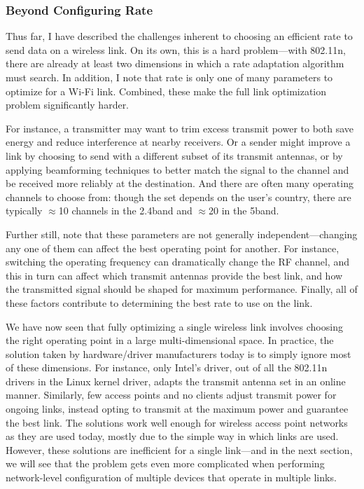 \subsubsection{Beyond Configuring Rate}
Thus far, I have described the challenges inherent to choosing an efficient rate to send data on a wireless link. On its own, this is a hard problem---with 802.11n, there are already at least two dimensions in which a rate adaptation algorithm must search. In addition, I note that rate is only one of many parameters to optimize for a Wi-Fi link. Combined, these make the full link optimization problem significantly harder.

For instance, a transmitter may want to trim excess transmit power to both save energy and reduce interference at nearby receivers. Or a sender might improve a link by choosing to send with a different subset of its transmit antennas, or by applying beamforming techniques to better match the signal to the channel and be received more reliably at the destination. And there are often many operating channels to choose from: though the set depends on the user's country, there are typically $\approx$10 channels in the 2.4\GHz band and $\approx$20 in the 5\GHz band.

Further still, note that these parameters are not generally independent---changing any one of them can affect the best operating point for another. For instance, switching the operating frequency can dramatically change the RF channel, and this in turn can affect which transmit antennas provide the best link, and how the transmitted signal should be shaped for maximum performance. Finally, all of these factors contribute to determining the best rate to use on the link.

We have now seen that fully optimizing a single wireless link involves choosing the right operating point in a large multi-dimensional space. In practice, the solution taken by hardware/driver manufacturers today is to simply ignore most of these dimensions. For instance, only Intel's  driver, out of all the 802.11n drivers in the Linux kernel driver, adapts the transmit antenna set in an online manner. Similarly, few access points and no clients adjust transmit power for ongoing links, instead opting to transmit at the maximum power and guarantee the best link. The solutions work well enough for wireless access point networks as they are used today, mostly due to the simple way in which links are used. However, these solutions are inefficient for a single link---and in the next section, we will see that the problem gets even more complicated when performing network-level configuration of multiple devices that operate in multiple links.

